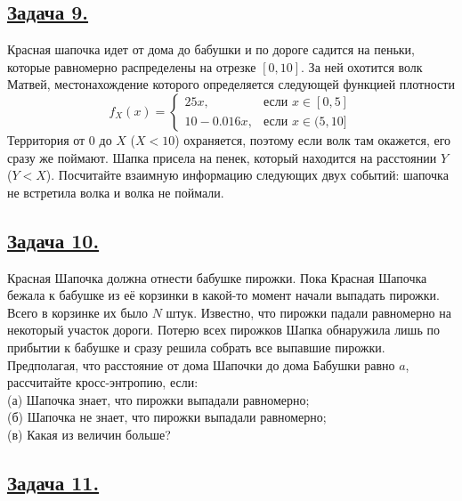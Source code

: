 \subsection*{\hyperref[sec:sol_problem9]{Задача 9.}}\label{sec:problem9} Красная шапочка идет от дома до бабушки и по дороге садится на пеньки, которые равномерно распределены на отрезке $[0, 10]$. За ней охотится волк Матвей, местонахождение которого определяется следующей функцией плотности
\begin{equation*}
f_X(x) = 
 \begin{cases}
   25x, &\text{если $x \in [0, 5]$}\\
   10 - 0.016x, &\text{если $x \in (5, 10]$}
 \end{cases}
\end{equation*}
Территория от 0 до $X$ ($X<10$) охраняется, поэтому если волк там окажется, его сразу же поймают. Шапка присела на пенек, который находится на расстоянии $Y$ ($Y<X$). Посчитайте взаимную информацию следующих двух событий: шапочка не встретила волка и волка не поймали. 
 
\subsection*{\hyperref[sec:sol_problem10]{Задача 10.}}\label{sec:problem10} Красная Шапочка должна отнести бабушке пирожки. Пока Красная Шапочка бежала к бабушке из её корзинки в какой-то момент начали выпадать пирожки. Всего в корзинке их было $N$ штук. Известно, что пирожки падали равномерно на некоторый участок дороги. Потерю всех пирожков Шапка обнаружила лишь по прибытии к бабушке и сразу решила собрать все выпавшие пирожки. Предполагая, что расстояние от дома Шапочки до дома Бабушки равно $a$, рассчитайте кросс-энтропию, если: \\
(а) Шапочка знает, что пирожки выпадали равномерно; \\
(б) Шапочка не знает, что пирожки выпадали равномерно; \\
(в) Какая из величин больше?

\subsection*{\hyperref[sec:sol_problem11]{Задача 11.}}\label{sec:problem11}
